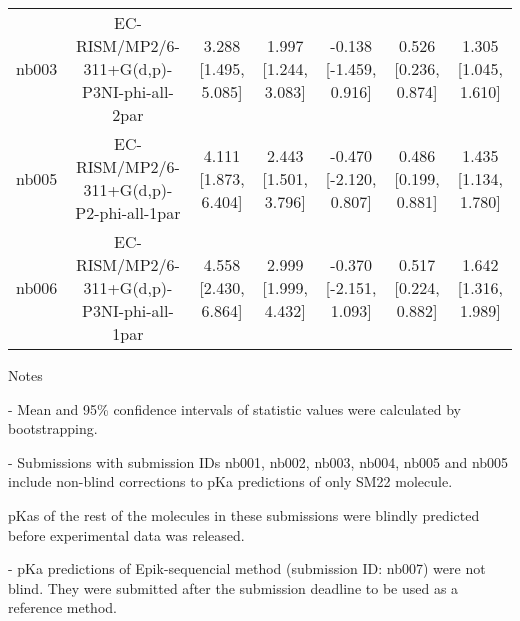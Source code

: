 \documentclass{article}
\begin{document}
\begin{center}
\begin{longtable}{|ccccccc|}
 nb003 &         EC-RISM/MP2/6-311+G(d,p)-P3NI-phi-all-2par &  3.288 [1.495, 5.085] &  1.997 [1.244, 3.083] &   -0.138 [-1.459, 0.916] &  0.526 [0.236, 0.874] &   1.305 [1.045, 1.610] \\
 nb005 &           EC-RISM/MP2/6-311+G(d,p)-P2-phi-all-1par &  4.111 [1.873, 6.404] &  2.443 [1.501, 3.796] &   -0.470 [-2.120, 0.807] &  0.486 [0.199, 0.881] &   1.435 [1.134, 1.780] \\
 nb006 &         EC-RISM/MP2/6-311+G(d,p)-P3NI-phi-all-1par &  4.558 [2.430, 6.864] &  2.999 [1.999, 4.432] &   -0.370 [-2.151, 1.093] &  0.517 [0.224, 0.882] &   1.642 [1.316, 1.989] \\
\end{longtable}
\end{center}

Notes

- Mean and 95\% confidence intervals of statistic values were calculated by bootstrapping.

- Submissions with submission IDs nb001, nb002, nb003, nb004, nb005 and nb005 include non-blind corrections to pKa predictions of only SM22 molecule.

pKas of the rest of the molecules in these submissions were blindly predicted before experimental data was released.

- pKa predictions of Epik-sequencial method (submission ID: nb007) were not blind. They were submitted after the submission deadline to be used as a reference method.
\end{document}
